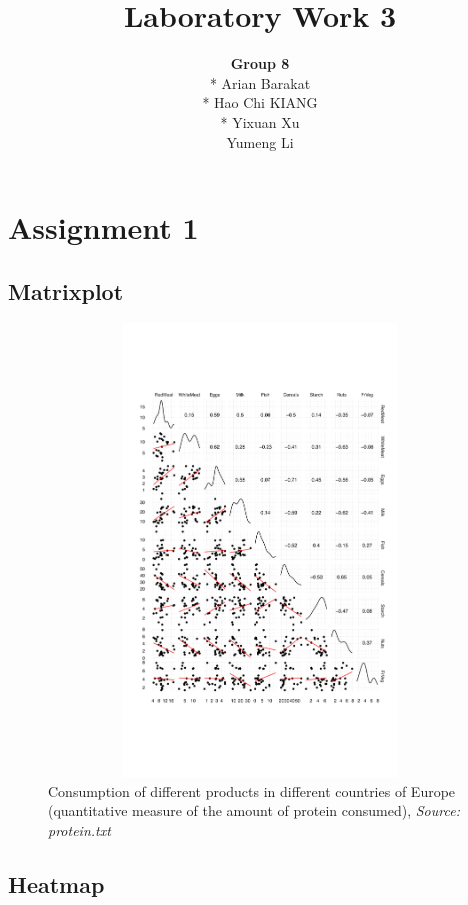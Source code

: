 \documentclass[11pt]{article}
\begin{document}
\author{\textbf{Group 8} \\* Arian Barakat \\* Hao Chi KIANG \\* Yixuan Xu \\ Yumeng Li}

\title{Laboratory Work 3}
\maketitle

\section*{Assignment 1}

\subsection*{Matrixplot}

\begin{figure}[H]
  \centering
    \includegraphics[height = 120mm, width = 120mm]{plot_matrix.pdf}
   \caption{Consumption of different products in different countries of Europe (quantitative measure of the amount of protein consumed), \textit{Source: protein.txt}}
   \label{fig:matrix_plot}
\end{figure}


\subsection*{Heatmap}
\end{document}
